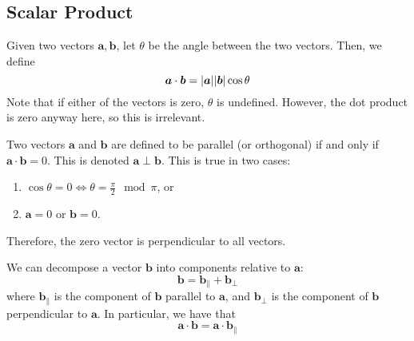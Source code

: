 \documentclass{article}
\begin{document}
	\subsection{Scalar Product}
	\begin{definition}
		Given two vectors $\bm a, \bm b$, let $\theta$ be the angle between the two vectors. Then, we define
		\[ \bm a \cdot \bm b = \abs{\bm a} \abs{\bm b} \cos \theta \]
		Note that if either of the vectors is zero, $\theta$ is undefined. However, the dot product is zero anyway here, so this is irrelevant.
	\end{definition}
	\begin{definition}
		Two vectors $\bm a$ and $\bm b$ are defined to be parallel (or orthogonal) if and only if $\bm a \cdot \bm b = 0$. This is denoted $\bm a \perp \bm b$. This is true in two cases:
		\begin{enumerate}
			\item $\cos \theta = 0 \iff \theta = \frac{\pi}{2} \mod \pi$, or
			\item $\bm a = 0$ or $\bm b = 0$.
		\end{enumerate}
		Therefore, the zero vector is perpendicular to all vectors.
	\end{definition}
	\begin{definition}
		We can decompose a vector $\bm b$ into components relative to $\bm a$:
		\[ \bm b = \bm b_\parallel + \bm b_\perp \]
		where $\bm b_\parallel$ is the component of $\bm b$ parallel to $\bm a$, and $\bm b_\perp$ is the component of $\bm b$ perpendicular to $\bm a$. In particular, we have that
		\[ \bm a \cdot \bm b = \bm a \cdot \bm b_\parallel \]
	\end{definition}
\end{document}
